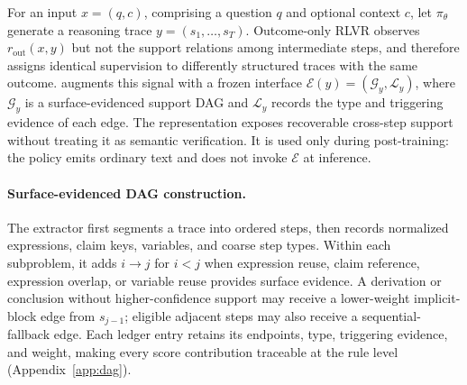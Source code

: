 For an input $x=(q,c)$, comprising a question $q$ and optional context $c$, let $\pi_\theta$ generate a reasoning trace $y=(s_1,\ldots,s_T)$. Outcome-only RLVR observes $r_{\mathrm{out}}(x,y)$ but not the support relations among intermediate steps, and therefore assigns identical supervision to differently structured traces with the same outcome. \method augments this signal with a frozen interface $\mathcal{E}(y)=(\mathcal{G}_y,\mathcal{L}_y)$, where $\mathcal{G}_y$ is a surface-evidenced support DAG and $\mathcal{L}_y$ records the type and triggering evidence of each edge. The representation exposes recoverable cross-step support without treating it as semantic verification. It is used only during post-training: the policy emits ordinary text and does not invoke $\mathcal{E}$ at inference.

\paragraph{Surface-evidenced DAG construction.}
The extractor first segments a trace into ordered steps, then records normalized expressions, claim keys, variables, and coarse step types. Within each subproblem, it adds $i\!\to\!j$ for $i<j$ when expression reuse, claim reference, expression overlap, or variable reuse provides surface evidence. A derivation or conclusion without higher-confidence support may receive a lower-weight implicit-block edge from $s_{j-1}$; eligible adjacent steps may also receive a sequential-fallback edge. Each ledger entry retains its endpoints, type, triggering evidence, and weight, making every score contribution traceable at the rule level (Appendix~\ref{app:dag}).

